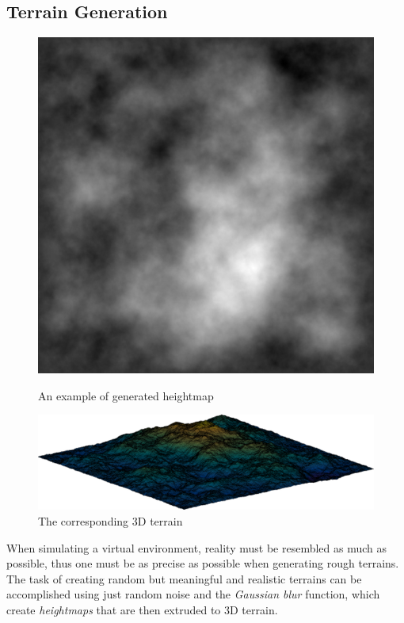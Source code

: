 \documentclass[]{usiinfbachelorproject}
\begin{document}
\subsection{Terrain Generation}
\begin{figure}[h]
  \includegraphics[width=\linewidth]{2dterrain}
    \caption{An example of generated heightmap}\label{fig:2dterrain}
\endminipage\hfill
{}
  \includegraphics[width=\linewidth]{3dterrain}
    \caption{The corresponding 3D terrain}\label{fig:3dterrain}
\endminipage\hfill
\end{figure}
\noindent
When simulating a virtual environment, reality must be resembled as much as possible, thus one must be as precise as possible when generating rough terrains.
The task of creating random but meaningful and realistic terrains can be accomplished using just random noise and the \textit{Gaussian blur} function, which create \textit{heightmaps} that are then extruded
to 3D terrain.
\end{document}
